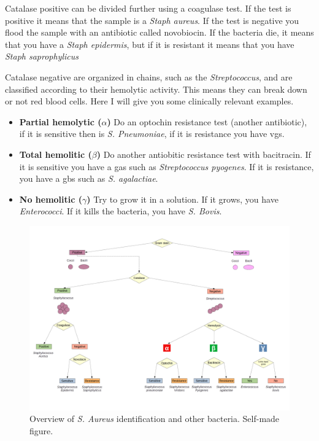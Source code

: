 Catalase positive can be divided further using a coagulase test. If the test is positive it means that the sample is a \textit{Staph aureus}. If the test is negative you flood the sample with an antibiotic called novobiocin. If the bacteria die, it means that you have a \textit{Staph epidermis}, but if it is resistant it means that you have \textit{Staph saprophylicus}

Catalase negative are organized in chains, such as the \textit{Streptococcus}, and are classified according to their hemolytic activity. This means they can break down or not red blood cells. Here I will give you some clinically relevant examples.

\begin{itemize}

    \item \textbf{Partial hemolytic ($\alpha$)} Do an optochin resistance test (another antibiotic), if it is sensitive then is \textit{S. Pneumoniae}, if it is resistance you have \gls{vgs}.
    
    \item \textbf{Total hemolitic ($\beta$)} Do another antiobitic resistance test with bacitracin. If it is sensitive you have a \gls{gas} such as \textit{Streptococcus pyogenes}. If it is resistance, you have a \gls{gbs} such as \textit{S. agalactiae}.
    
    \item \textbf{No hemolitic ($\gamma$)} Try to grow it in a  solution. If it grows, you have \textit{Enterococci}. If it kills the bacteria, you have \textit{S. Bovis}.
    
\end{itemize}

    \begin{figure}[h!]
        \centering
            \includegraphics[width=0.9\linewidth]{figures/Staph/Identification.png}
            \caption{Overview of \textit{S. Aureus} identification and other bacteria. Self-made figure.}
            \label{figure:identification}
    \end{figure}

